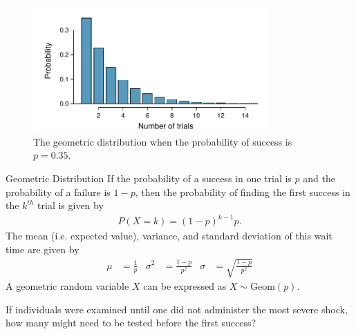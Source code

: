 \begin{figure}[h]
\centering
\includegraphics[width=0.8\textwidth]{ch_distributions_oi_biostat/figures/geometricDist35/geometricDist35}
\caption{The geometric distribution when the probability of success is \mbox{$p=0.35$}.}
\label{geometricDist35}
\end{figure}

\begin{onebox}{Geometric Distribution}
If the probability of a success in one trial is $p$ and the probability of a failure is $1-p$, then the probability of finding the first success in the $k^{th}$ trial is given by
\begin{eqnarray*}
P(X = k) = (1-p)^{k-1}p.
\end{eqnarray*}
The mean (i.e. expected value), variance, and standard deviation of this wait time are given by
\begin{align*}
\mu &= \frac{1}{p}
	&\sigma^2&=\frac{1-p}{p^2}
	&\sigma &= \sqrt{\frac{1-p}{p^2}}
\label{geomFormulas}
\end{align*}
A geometric random variable $X$ can be expressed as $X \sim \textrm{Geom}(p)$.
\end{onebox}


\begin{exercisewrap}
\begin{nexercise}
If individuals were examined until one did not administer the most severe shock, how many might need to be tested before the first success?\footnotemark{}
\end{nexercise}
\end{exercisewrap}

